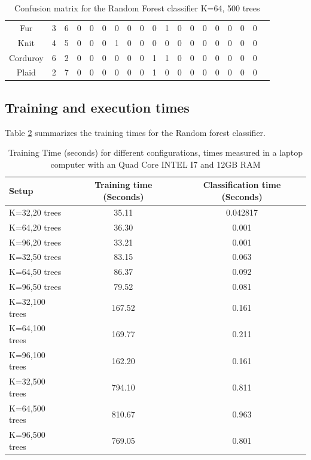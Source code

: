 \documentclass[10pt,twocolumn,letterpaper]{article}
\begin{document}
\begin{table}[t]
\begin{tabular}{c | c | c |c |c |c |c |c |c |c |c |c |c |c |c |c |c | c | c }
Fur &   3   &  6   &  0   &  0   &  0   &  0   &  0   &  0  &   0   &  1   &  0  &   0  &   0  &   0   &  0  &   0   &  0\\
Knit &  4   &  5   &  0   &  0   &  0   &  1   &  0   &  0  &   0   &  0   &  0  &   0  &   0  &   0   &  0  &   0   &  0\\
Corduroy &   6   & 2   &  0    & 0    & 0    & 0    & 0    & 0   &  1    & 1    & 0    & 0   &  0   &  0    & 0   &  0   &  0\\
Plaid &   2   &  7  &   0   &  0   &  0   &  0   &  0   &  0   &  1   &  0   &  0   &  0   &  0  &   0   &  0  &   0  &   0\\
\end{tabular}
\caption{Confusion matrix for the Random Forest classifier K=64, 500 trees}
\label{table:table4}
\end{table}

\subsection{Training and execution times}
Table \ref{table:times} summarizes the training times for the Random forest classifier.

\begin{table}[t]
\centering
\begin{tabular}{ l | c | c}
Setup & Training time (Seconds) & Classification time (Seconds)    \\
\hline	
K=32,20 trees & 35.11 & 0.042817\\
K=64,20 trees &   36.30 & 0.001 \\
K=96,20 trees &  33.21  & 0.001 \\
K=32,50 trees & 83.15  & 0.063 \\
K=64,50 trees &  86.37 & 0.092 \\
K=96,50 trees &   79.52 & 0.081 \\
K=32,100 trees &  167.52 & 0.161 \\
K=64,100 trees &  169.77 & 0.211 \\
K=96,100 trees &  162.20 & 0.161\\
K=32,500 trees &  794.10 & 0.811 \\
K=64,500 trees &  810.67 & 0.963 \\
K=96,500 trees &  769.05 & 0.801 \\

\end{tabular}
\caption{Training Time (seconds) for different configurations, times measured in a laptop computer with an Quad Core INTEL I7 and 12GB RAM}
\label{table:times}
\end{table}
\end{document}

